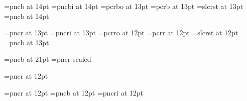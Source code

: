 \font\secrm=pncb at 14pt
\font\secit=pncbi at 14pt
\font\secsl=pcrbo at 13pt
\font\sectt=pcrb at 13pt
\font\secsf=slcrst at 13pt
\font\secbf=pncb at 14pt

\font\ssecrm=pncr at 13pt
\font\ssecit=pncri at 13pt
\font\ssecsl=pcrro at 12pt
\font\ssectt=pcrr at 12pt
\font\ssecsf=slcrst at 12pt
\font\ssecbf=pncb at 13pt

\font\titlerm=pncb at 21pt
\font\authorrm=pncr scaled 

\font\truesecrm=pncr at 12pt

\font\shortcontrm=pncr at 12pt 
\font\shortcontbf=pncb at 12pt 
\font\shortcontsl=pncri at 12pt

\def\smartitalicx{\ifx\next,\else\ifx\next-\else\ifx\next.\else\/\fi\fi\fi}
\def\smartitalic#1{{\it #1}\futurelet\next\smartitalicx}
%
\def\smartslantx{\ifx\next,\else\ifx\next-\else\ifx\next.\else\/\fi\fi\fi}
\def\smartslant#1{{\sl #1}\futurelet\next\smartslantx}

\let\i=\smartitalic
\let\var=\smartslant
\let\dfn=\smartitalic
\let\emph=\smartitalic
\let\cite=\smartitalic

